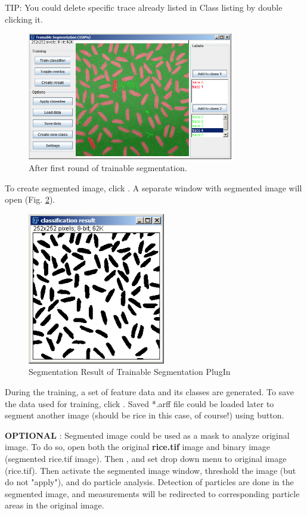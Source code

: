 \begin{indentexercise}{1}
TIP: You could delete specific trace already
listed in Class listing by double clicking it.

\begin{figure}[htbp]
\begin{center}
\includegraphics[width=9cm]{fig/CMCIBasicCourse201102-img123.png}
\caption{ After first round of trainable segmentation.}
\label{fig:img123}
\end{center}
\end{figure}

To create segmented image, click . 
A separate window with segmented image will open (Fig. \ref{fig:img124}). 

\begin{figure}[htbp]
\begin{center}
\includegraphics[width=6cm]{fig/CMCIBasicCourse201102-img124.png}
\caption{ Segmentation Result of Trainable Segmentation PlugIn}
\label{fig:img124}
\end{center}
\end{figure}

During the training, a set of feature data and its classes are generated. To save the data used for training, click . Saved *.arff file could be loaded later to segment another image 
(should be rice in this case, of course!) using  button.

\textbf{OPTIONAL} : Segmented image could be used as a mask to analyze original image. 
To do so, open both the original \textbf{rice.tif} image and binary image (segmented rice.tif image).
Then , and set  drop down menu to
original image (rice.tif). Then activate the segmented image window, threshold the image (but do not
"apply"), and do particle analysis. 
Detection of particles are done in the segmented image, and
measurements will be redirected to corresponding particle areas in the
original image.  
\end{indentexercise}

